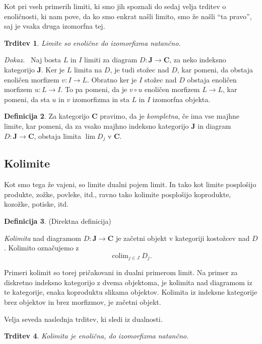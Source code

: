 \documentclass[12pt,a4paper]{book}
\theoremstyle{definition}
\newtheorem{definicija}{Definicija}[chapter]
\theoremstyle{plain}
\newtheorem{trditev}[definicija]{Trditev}
\newenvironment{dokaz}{\emph{Dokaz.}\ }{\hspace{\fill}{$\Box$}}
\theoremstyle{definition}
\theoremstyle{remark}
\newcommand{\cat}[1]{\textbf{#1}}
\DeclareMathOperator{\colim}{colim}
\begin{document}
Kot pri vseh primerih limiti, ki smo jih spoznali do sedaj velja trditev o enoličnosti, ki nam pove, da ko smo enkrat našli limito, smo že našli "`ta pravo"', saj je vsaka druga izomorfna tej.
\begin{trditev}
Limite so enolične do izomorfizma natančno.
\end{trditev}
\begin{dokaz}
Naj bosta $L$ in $I$ limiti za diagram $D : \cat{J} \to \cat{C}$, za neko indeksno kategorijo $\cat{J}$. Ker je $L$ limita na $D$, je tudi stožec nad $D$, kar pomeni, da obstaja enoličen morfizem $v : I \to L$. Obratno ker je $I$ stožec nad $D$ obstaja enoličen morfizem $u : L \to I$. To pa pomeni, da je $v \circ u$ enoličen morfizem $L \to L$, kar pomeni, da sta $u$ in $v$ izomorfizma in sta $L$ in $I$ izomorfna objekta.
\end{dokaz}

\begin{definicija}
Za kategorijo $\cat{C}$ pravimo, da je \emph{kompletna}, če ima vse majhne limite, kar pomeni, da za vsako majhno indeksno kategorijo $\cat{J}$ in diagram $D : \cat{J} \to \cat{C}$, obstaja limita $\lim D_j$ v $\cat{C}$.
\end{definicija}



\subsection{Kolimite}

Kot smo tega že vajeni, so limite dualni pojem limit. In tako kot limite posplošijo produkte, zožke, povleke, itd., ravno tako kolimite posplošijo koprodukte, kozožke, potiske, itd.

\begin{definicija} (Direktna definicija)

\emph{Kolimita} nad diagramom $D : \cat{J} \to \cat{C}$ je začetni objekt v kategoriji kostožcev nad $D$. Kolimito označujemo z
$$\colim_{j \in J} D_j.$$
\end{definicija}

Primeri kolimit so torej pričakovani in dualni primerom limit. Na primer za diskretno indeksno kategorijo z dvema objektoma, je kolimita nad diagramom iz te kategorije, enaka koproduktu slikama objektov. Kolimita iz indeksne kategorije brez objektov in brez morfizmov, je začetni objekt.


Velja seveda naslednja trditev, ki sledi iz dualnosti.

\begin{trditev}
Kolimita je enolična, do izomorfizma natančno.
\end{trditev}
\end{document}
